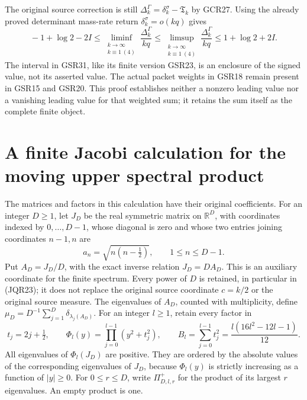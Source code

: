 The original source correction is still
$\Delta_k^\Gamma=\delta_k^\sigma-\mathfrak T_k$ by GCR27.
Using the already proved determinant mass-rate return
$\delta_k^\sigma=o(kq)$ gives
\[
 \boxed{\quad
 -1+\log2-2I
 \leq\liminf_{\substack{k\to\infty\\k\equiv1\ (4)}}
                       \frac{\Delta_k^\Gamma}{kq}
 \leq\limsup_{\substack{k\to\infty\\k\equiv1\ (4)}}
                       \frac{\Delta_k^\Gamma}{kq}
 \leq1+\log2+2I.
 \quad}\tag{GSR33}
\]
The interval in GSR31, like its finite version GSR23,
is an enclosure of the signed value, not its asserted value.
The actual packet weights in GSR18 remain present in GSR15
and GSR20. This proof establishes neither a nonzero leading
value nor a vanishing leading value for that weighted sum;
it retains the sum itself as the complete finite object.


\section{A finite Jacobi calculation for the moving upper spectral product}

The matrices and factors in this calculation have their original coefficients.
For an integer \(D\geq1\), let \(J_D\) be the real symmetric matrix on
\(\mathbb R^D\), with coordinates indexed by \(0,\ldots,D-1\), whose diagonal
is zero and whose two entries joining coordinates \(n-1,n\) are
\[
 a_n=\sqrt{n(n-\tfrac12)},\qquad 1\leq n\leq D-1.
 \tag{JQR1}
\]
Put \(A_D=J_D/D\), with the exact inverse relation \(J_D=D A_D\).
This is an auxiliary coordinate for the finite spectrum.  Every power of
\(D\) is retained, in particular in (JQR23); it does not replace the
original source coordinate \(c=k/2\) or the original source measure.
The eigenvalues of \(A_D\), counted with multiplicity, define
\(\mu_D=D^{-1}\sum_{j=1}^D\delta_{\lambda_j(A_D)}\).
For an integer \(l\geq1\), retain every factor in
\[
 t_j=2j+\tfrac12,\qquad
 \Phi_l(y)=\prod_{j=0}^{l-1}(y^2+t_j^2),\qquad
 B_l=\sum_{j=0}^{l-1}t_j^2
     =\frac{l(16l^2-12l-1)}{12}.
 \tag{JQR2}
\]
All eigenvalues of \(\Phi_l(J_D)\) are positive.  They are ordered by the
absolute values of the corresponding eigenvalues of \(J_D\), because
\(\Phi_l(y)\) is strictly increasing as a function of \(|y|\geq0\).
For \(0\leq r\leq D\), write \(\Pi^+_{D,l,r}\) for the product of its
largest \(r\) eigenvalues.  An empty product is one.

